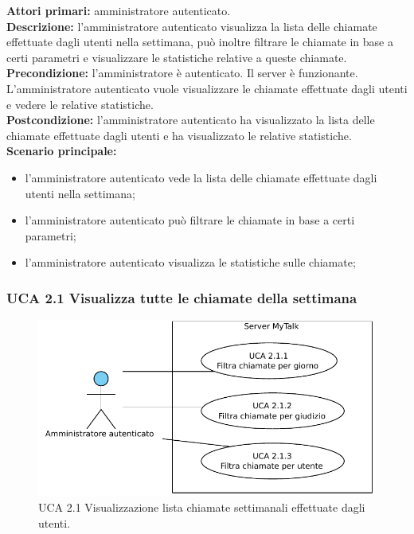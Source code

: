 \noindent
\textbf{Attori primari:} amministratore autenticato.\\
\textbf{Descrizione:} l'amministratore autenticato visualizza la lista delle chiamate effettuate dagli utenti nella settimana, può inoltre filtrare le chiamate in base a certi parametri e visualizzare le statistiche relative a queste chiamate.\\
\textbf{Precondizione:} l'amministratore è autenticato. Il server è funzionante. L'amministratore autenticato vuole visualizzare le chiamate effettuate dagli utenti e vedere le relative statistiche.\\
\textbf{Postcondizione:} l'amministratore autenticato ha visualizzato la lista delle chiamate effettuate dagli utenti e ha visualizzato le relative statistiche.\\
\textbf{Scenario principale:}
\begin{itemize}
\item l'amministratore autenticato vede la lista delle chiamate effettuate dagli utenti nella settimana;
\item l'amministratore autenticato può filtrare le chiamate in base a certi parametri;
\item l'amministratore autenticato visualizza le statistiche sulle chiamate;
\end{itemize}

\subsubsection{UCA 2.1 Visualizza tutte le chiamate della settimana}

\begin{figure}[htbp]
\centering
\includegraphics[scale=0.7]{./casi_uso/UCA2-1.pdf}
\caption{UCA 2.1 Visualizzazione lista chiamate settimanali effettuate dagli utenti.}
\end{figure}

